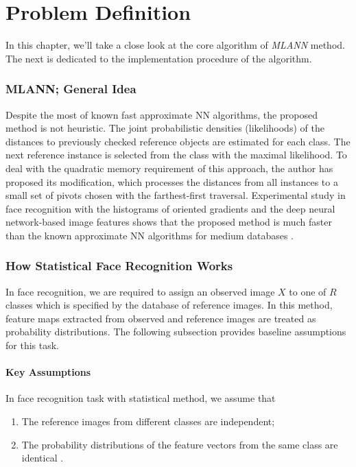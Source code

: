 \chapter{Problem Definition}

In this chapter, we'll take a close look at the core algorithm of \textit{MLANN} method. The next is dedicated to the implementation procedure of the algorithm.

\subsection{MLANN; General Idea} 
Despite the most of known fast approximate NN algorithms, the proposed method is not heuristic. The joint probabilistic densities (likelihoods) of the distances to previously checked reference objects are estimated for each class. The next reference instance is selected from the class with the maximal likelihood. To deal with the quadratic memory requirement of this approach, the author has proposed its modification, which processes the distances from all instances to a small set of pivots chosen with the farthest-first traversal. Experimental study in face recognition with the histograms of oriented gradients and the deep neural network-based image features shows that the proposed method is much faster than the known approximate NN algorithms for medium databases \cite{def1}.

\subsection{How Statistical Face Recognition Works}
In face recognition, we are required to assign an observed image $X$ to one of $R$ classes which is specified by the database of reference images. In this method, feature maps extracted from observed and reference images are treated as probability distributions. The following subsection provides baseline assumptions for this task.

\subsubsection{Key Assumptions}
In face recognition task with statistical method, we assume that
\begin{enumerate}
	\item The reference images from different classes are independent;
	\item The probability distributions of the feature vectors from the same class are identical \cite{def1}.
\end{enumerate}

